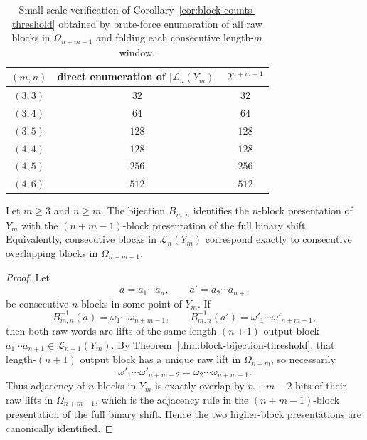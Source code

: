 \begin{table}[t]
\centering
\small
\begin{tabular}{ccc}
\toprule
$(m,n)$ & direct enumeration of $\lvert\mathcal L_n(Y_m)\rvert$ & $2^{n+m-1}$ \\
\midrule
$(3,3)$ & $32$ & $32$ \\
$(3,4)$ & $64$ & $64$ \\
$(3,5)$ & $128$ & $128$ \\
$(4,4)$ & $128$ & $128$ \\
$(4,5)$ & $256$ & $256$ \\
$(4,6)$ & $512$ & $512$ \\
\bottomrule
\end{tabular}
\caption{Small-scale verification of Corollary~\ref{cor:block-counts-threshold}
obtained by brute-force enumeration of all raw blocks in $\Omega_{n+m-1}$ and
folding each consecutive length-$m$ window.}
\label{tab:small-block-counts}
\end{table}

\begin{corollary}
\label{cor:higher-block-identification}
Let $m\ge 3$ and $n\ge m$.  The bijection $B_{m,n}$ identifies the
$n$-block presentation of $Y_m$ with the $(n+m-1)$-block presentation of the
full binary shift.  Equivalently, consecutive blocks in $\mathcal L_n(Y_m)$
correspond exactly to consecutive overlapping blocks in $\Omega_{n+m-1}$.
\end{corollary}

\begin{proof}
Let
\[
a=a_1\cdots a_n,
\qquad
a'=a_2\cdots a_{n+1}
\]
be consecutive $n$-blocks in some point of $Y_m$.  If
\[
B_{m,n}^{-1}(a)=\omega_1\cdots\omega_{n+m-1},
\qquad
B_{m,n}^{-1}(a')=\omega'_1\cdots\omega'_{n+m-1},
\]
then both raw words are lifts of the same length-$(n+1)$ output block
$a_1\cdots a_{n+1}\in\mathcal L_{n+1}(Y_m)$.  By
Theorem~\ref{thm:block-bijection-threshold}, that length-$(n+1)$ output block
has a unique raw lift in $\Omega_{n+m}$, so necessarily
\[
\omega'_1\cdots\omega'_{n+m-2}=\omega_2\cdots\omega_{n+m-1}.
\]
Thus adjacency of $n$-blocks in $Y_m$ is exactly overlap by $n+m-2$ bits of
their raw lifts in $\Omega_{n+m-1}$, which is the adjacency rule in the
$(n+m-1)$-block presentation of the full binary shift.  Hence the two
higher-block presentations are canonically identified.
\end{proof}

